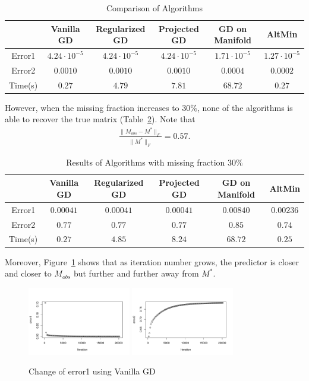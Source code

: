 \documentclass[12pt]{article}%
\begin{document}
\begin{table}[H]
\centering
\caption{Comparison of Algorithms}
\label{table1}
\begin{tabular}{|c|c|c|c|c|c|}
\hline
 & Vanilla GD & Regularized GD & Projected GD & GD on Manifold & AltMin\\
\hline
Error1 & $4.24\cdot 10^{-5}$  & $4.24\cdot 10^{-5}$ & $ 4.24\cdot 10^{-5} $ & $ 1.71\cdot 10^{-5} $ & $ 1.27\cdot 10^{-5} $\\
\hline
Error2 & $0.0010$  & $0.0010$ & $ 0.0010 $ & $ 0.0004 $ & $ 0.0002 $\\
\hline
Time(s) & $0.27 $ & $ 4.79 $ & $ 7.81 $  & $ 68.72 $ & $ 0.27 $\\
\hline

\end{tabular}
\end{table}

\noindent
However, when the missing fraction increases to $30\%$, none of the algorithms is able to recover the true matrix (Table~\ref{table2}). Note that 
\begin{align*}
\frac{\|M_{obs}-M^*\|_F}{\|M^*\|_F} = 0.57.
\end{align*}

\begin{table}[H]
\centering
\caption{Results of Algorithms with missing fraction $30\%$}
\label{table2}
\begin{tabular}{|c|c|c|c|c|c|}
\hline
 & Vanilla GD & Regularized GD & Projected GD & GD on Manifold & AltMin\\
\hline
Error1 & $0.00041$  & $0.00041$ & $ 0.00041$ & $ 0.00840 $ & $ 0.00236 $\\
\hline
Error2 & $0.77$  & $0.77$ & $ 0.77 $ & $ 0.85 $ & $ 0.74 $\\
\hline
Time(s) & $0.27 $ & $ 4.85 $ & $ 8.24 $  & $ 68.72 $ & $ 0.25 $\\
\hline

\end{tabular}
\end{table}

\noindent
Moreover, Figure~\ref{err} shows that as iteration number grows, the predictor is closer and closer to $M_{obs}$ but further and further away from $M^*$.

\begin{figure}[H]
\centering
\caption{Change of error1 using Vanilla GD}
\label{err}
\includegraphics[width = 0.4\textwidth]{Graphs/Error1.pdf}
\includegraphics[width = 0.4\textwidth]{Graphs/Error2.pdf}
\end{figure}
\end{document}

